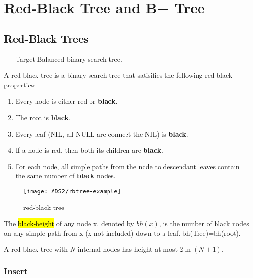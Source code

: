 \newpage

\section{Red-Black Tree and B+ Tree}

\subsection{Red-Black Trees}
\begin{itemize}
    \item [Target] Balanced binary search tree. 
\end{itemize}
\begin{definition}
    A \textcolor{light_blue}{red-black tree} is a binary search tree that satisifies the following red-black properties:
    \begin{enumerate}
        \item Every node is either \textcolor{light_red}{red} or \textbf{black}. 
        \item The root is \textbf{black}. 
        \item Every leaf (NIL, all NULL are connect the NIL) is \textbf{black}. 
        \item If a node is \textcolor{light_red}{red}, then both its children are \textbf{black}. 
        \item For each node, all simple paths from the node to descendant leaves contain the \textcolor{light_red}{same number of} \textbf{black} \textcolor{light_red}{nodes}. 
    \end{enumerate}
\end{definition}

\begin{figure}[H]
    \centering
    \texttt{[image: ADS2/rbtree-example]}
    \caption{red-black tree}
\end{figure}


\begin{definition}
    The \hl{black-height} of any node x, denoted by $bh(x)$, is the number of black nodes on any simple path from x (x not included) down to a leaf. bh(Tree)=bh(root). 
\end{definition}

\begin{lemma}
    A red-black tree with $N$ internal nodes has height at most $2\ln (N+1)$. 
\end{lemma}

\subsubsection{Insert}

